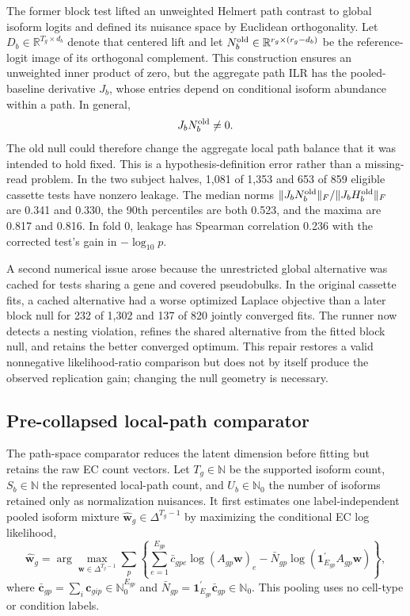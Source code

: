 \documentclass[11pt]{article}
\begin{document}
The former block test lifted an unweighted Helmert path contrast to global isoform logits and defined its nuisance space by Euclidean orthogonality. Let \(D_b\in\mathbb R^{T_g\times d_b}\) denote that centered lift and let \(N_b^{\rm old}\in\mathbb R^{r_g\times(r_g-d_b)}\) be the reference-logit image of its orthogonal complement. This construction ensures an unweighted inner product of zero, but the aggregate path ILR has the pooled-baseline derivative \(J_b\), whose entries depend on conditional isoform abundance within a path. In general, \[
 J_bN_b^{\rm old}\neq0.
\]
The old null could therefore change the aggregate local path balance that it was intended to hold fixed. This is a hypothesis-definition error rather than a missing-read problem. In the two subject halves, 1,081 of 1,353 and 653 of 859 eligible cassette tests have nonzero leakage. The median norms \(\|J_bN_b^{\rm old}\|_F/\|J_bH_b^{\rm old}\|_F\) are 0.341 and 0.330, the 90th percentiles are both 0.523, and the maxima are 0.817 and 0.816. In fold 0, leakage has Spearman correlation 0.236 with the corrected test's gain in \(-\log_{10}p\).

A second numerical issue arose because the unrestricted global alternative was cached for tests sharing a gene and covered pseudobulks. In the original cassette fits, a cached alternative had a worse optimized Laplace objective than a later block null for 232 of 1,302 and 137 of 820 jointly converged fits. The runner now detects a nesting violation, refines the shared alternative from the fitted block null, and retains the better converged optimum. This repair restores a valid nonnegative likelihood-ratio comparison but does not by itself produce the observed replication gain; changing the null geometry is necessary.

\subsection*{Pre-collapsed local-path comparator}

The path-space comparator reduces the latent dimension before fitting but retains the raw EC count vectors. Let \(T_g\in\mathbb N\) be the supported isoform count, \(S_b\in\mathbb N\) the represented local-path count, and \(U_b\in\mathbb N_0\) the number of isoforms retained only as normalization nuisances. It first estimates one label-independent pooled isoform mixture \(\widehat{\bm w}_g\in\Delta^{T_g-1}\) by maximizing the conditional EC log likelihood, \[\widehat{\bm w}_g=\arg\max_{\bm w\in\Delta^{T_g-1}}\sum_p\left\{\sum_{e=1}^{E_{gp}}\bar c_{gpe}\log(A_{gp}\bm w)_e-\bar N_{gp}\log(\bm1_{E_{gp}}^\prime A_{gp}\bm w)\right\},\] where \(\bar{\bm c}_{gp}=\sum_i\bm c_{gip}\in\mathbb N_0^{E_{gp}}\) and \(\bar N_{gp}=\bm1_{E_{gp}}^\prime\bar{\bm c}_{gp}\in\mathbb N_0\). This pooling uses no cell-type or condition labels.
\end{document}
